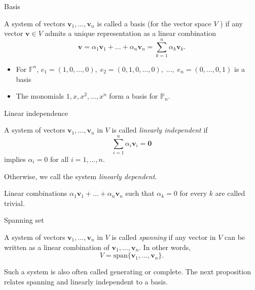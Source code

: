 \documentclass [aspectratio=169]{beamer}
\newcommand{\bv}{{\mathbf{v}}}
\newcommand{\zerovec}{{\mathbf{0}}}
\newcommand{\F}{{\mathbb{F}}}
\begin{document}
\begin{frame}{Basis}
\begin{definition}
A system of vectors $\bv_1, \ldots, \bv_n$ is called a basis (for the vector space $V$ ) if any vector $\bv \in V$ admits a unique representation as a linear combination
$$
\bv = \alpha_1 \bv_1 + \ldots + \alpha_n \bv_n = \sum_{k=1}^n \alpha_k \bv_k.
$$
\end{definition}
\begin{example}
\begin{itemize}
    \item For $\F^n$, $e_1 = (1,0,\ldots, 0), \; e_2 = (0,1,0,\ldots,0), \; \ldots, \; e_n = (0, \ldots, 0, 1)$ is a basis
    \item The monomials $ 1, x, x^2, \ldots, x^n$ form a basis for $\mathbb{P}_n$.
\end{itemize}
\end{example}
\end{frame}


\begin{frame}{Linear independence}
\begin{definition}
A system of vectors $\bv_1,\ldots,\bv_n$ in $V$ is called \emph{linearly independent} if $$\sum_{i=1}^n \alpha_i\bv_i = \zerovec$$ implies $\alpha_i=0$ for all $i=1,\ldots,n$. 
\vspace{0.5em} 

Otherwise, we call the system \emph{linearly dependent}.
\end{definition}

\vspace{1em} 

Linear combinations  $\alpha_{1}\bv_{1}+...+\alpha_{n}\bv_{n}$  such that  $\alpha_k = 0$ for every $k$ are called trivial.

\end{frame}

\begin{frame}{Spanning set}
\begin{definition}
 A system of vectors $\bv_1,\ldots,\bv_n$ in $V$ is called \emph{spanning}  if any vector in $V$ can be written as a linear combination of $\bv_1,\ldots,\bv_n$. In other words,
\begin{equation*}
    V = \mathrm{span}\{\bv_1,\ldots,\bv_n\}.
\end{equation*}
\end{definition}

Such a system is also often called generating or complete. The next proposition relates spanning and linearly independent to a basis. 
\end{frame}
\end{document}
